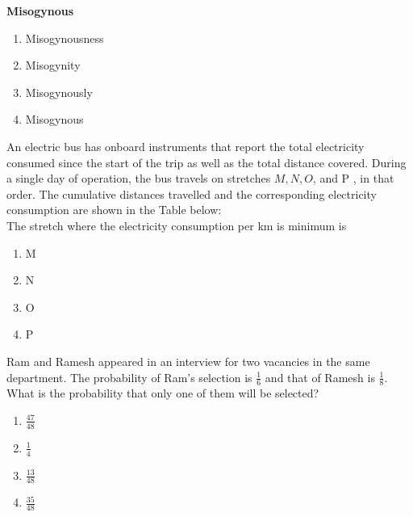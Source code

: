\textbf{Misogynous}\\
 \hfill{}
\begin{multicols}{4}
    \begin{enumerate}
        \item   Misogynousness
        \item Misogynity
        \item  Misogynously
        \item Misogynous
    \end{enumerate}
\end{multicols}
\item An electric bus has onboard instruments that report the total electricity consumed since the start of the trip as well as the total distance covered. During a single day of operation, the bus travels on stretches ${M}, {N}, {O}$, and P , in that order. The cumulative distances travelled and the corresponding electricity consumption are shown in the Table below:
    \\
    The stretch where the electricity consumption per km is minimum is
     \hfill{}
\begin{multicols}{4}
    \begin{enumerate}
        \item M
        \item N
        \item O
        \item P
    \end{enumerate}
\end{multicols}
  
  \item Ram and Ramesh appeared in an interview for two vacancies in the same department. The probability of Ram's selection is $\frac{1} { 6}$ and that of Ramesh is $\frac{1} { 8}$. What is the probability that only one of them will be selected?
  \hfill{}
  \begin{multicols}{4}
			\begin{enumerate}
   \item $\frac{47}{48}$
\item $\frac{1}{4}$
\item $\frac{13}{48}$
\item  $\frac{35}{48}$
\end{enumerate}
		\end{multicols}
   
